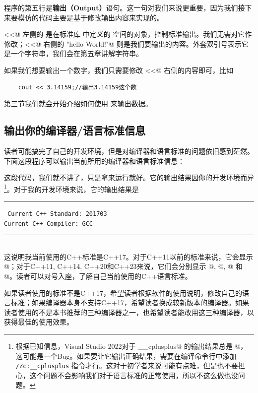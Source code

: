 程序的第五行是\textbf{输出（Output）}语句。这一句对我们来说更重要，因为我们接下来要模仿的代码主要是基于修改输出内容来实现的。\par
\lstinline@<<@ 左侧的 \lstinline@cout@ 是在标准库 \lstinline@iostream@ 中定义的 \lstinline@std@ 空间的对象，控制标准输出。我们无需对它作修改；\lstinline@<<@ 右侧的 \lstinline@"hello World!"@ 则是我们要输出的内容。外套双引号表示它是一个字符串，我们会在第五章讲解字符串。\par
如果我们想要输出一个数字，我们只需要修改 \lstinline@<<@ 右侧的内容即可，比如
\begin{lstlisting}
    cout << 3.14159;//输出3.14159这个数
\end{lstlisting}
第三节我们就会开始介绍如何使用 \lstinline@cout@ 来输出数据。\par
\subsection*{输出你的编译器/语言标准信息}
读者可能搞完了自己的开发环境，但是对编译器和语言标准的问题依旧感到茫然。下面这段程序可以输出当前所用的编译器和语言标准信息：

这段代码，我们就不讲了，只是拿来运行就好。它的输出结果因你的开发环境而异\footnote{根据已知信息，Visual Studio 2022对于 \lstinline@__cplusplus@ 的输出结果总是 @，这可能是一个Bug。如果要让它输出正确结果，需要在编译命令行中添加 \texttt{/Zc:\_\_cplusplus} 指令才行。这对于初学者来说可能有点难，但是也不要担心，这个问题不会影响我们对于语言标准的正常使用，所以不这么做也没问题。}。对于我的开发环境来说，它的输出结果是\\\noindent\rule{\linewidth}{.2pt}\texttt{
Current C++ Standard: 201703\\
Current C++ Compiler: GCC
}\\\noindent\rule{\linewidth}{.2pt}\\
这说明我当前使用的C++标准是C++17。对于C++11以前的标准来说，它会显示 @；对于C++11, C++14, C++20和C++23来说，它们会分别显示 @, @, @ 和 @。读者可以对号入座，了解自己当前使用的C++语言标准。\par
如果读者使用的标准不是C++17，希望读者根据软件的使用说明，修改自己的语言标准；如果编译器本身不支持C++17，希望读者换成较新版本的编译器。如果读者使用的不是本书推荐的三种编译器之一，也希望读者能改用这三种编译器，以获得最佳的使用效果。\par
